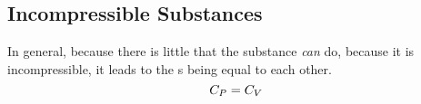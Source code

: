 \subsection{Incompressible Substances}\label{subsubsec:Incompressible_Substances}
In general, because there is little that the substance \textit{can} do, because it is incompressible, it leads to the s being equal to each other.
\begin{equation*}
  C_{P} = C_{V}
\end{equation*}



